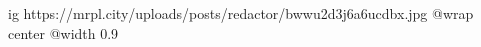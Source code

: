  
 
 
 
 

\ifcmt
  ig https://mrpl.city/uploads/posts/redactor/bwwu2d3j6a6ucdbx.jpg
  @wrap center
  @width 0.9
\fi
